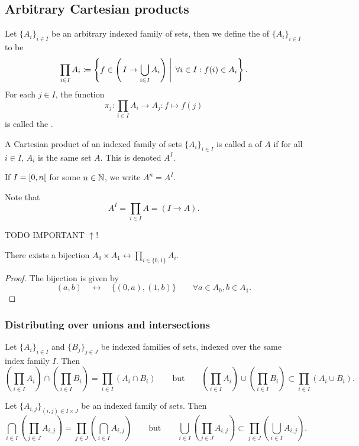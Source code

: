 \subsection{Arbitrary Cartesian products}
\begin{definition}
Let $\{A_i\}_{i\in I}$ be an arbitrary indexed family of sets, then we define the  of $\{A_i\}_{i\in I}$ to be
\[ \prod_{i\in I}A_i \coloneqq \left\{ f\in \left(\left. I \to \bigcup_{i\in I}A_i \right) \; \right| \; \forall i\in I: f(i) \in A_i \right\}. \]
For each $j\in I$, the function
\[ \pi_j : \prod_{i\in I}A_i \to A_j: f\mapsto f(j) \]
is called the .
\end{definition}

\begin{definition}
A Cartesian product of an indexed family of sets $\{A_i\}_{i\in I}$ is called a  of $A$ if for all $i\in I$, $A_i$ is the same set $A$. This is denoted $A^I$.
\end{definition}
If $I = \interval[co]{0,n}$ for some $n\in \mathbb{N}$, we write $A^n = A^I$.

Note that
\[ A^I = \prod_{i\in I} A = (I\to A).  \]

TODO IMPORTANT $\uparrow$!

\begin{lemma}
There exists a bijection $A_0\times A_1 \leftrightarrow \prod_{i\in\{0,1\}} A_i$.
\end{lemma}
\begin{proof}
The bijection is given by
\[ (a,b) \quad\leftrightarrow\quad \{(0,a),(1,b)\} \qquad \forall a\in A_0, b\in A_1. \]
\end{proof}

\subsubsection{Distributing over unions and intersections}
\begin{lemma}
Let $\{A_{i}\}_{i \in I}$ and $\{B_{j}\}_{j \in J}$ be indexed families of sets, indexed over the same index family $I$. Then
\[ \left(\prod_{i\in I}A_i\right)\cap\left(\prod_{i\in I}B_i\right) = \prod_{i\in I}(A_i\cap B_i) \qquad\text{but}\qquad \left(\prod_{i\in I}A_i\right)\cup\left(\prod_{i\in I}B_i\right) \subset \prod_{i\in I}(A_i\cup B_i). \]
\end{lemma}

\begin{lemma}
Let $\{A_{i,j}\}_{(i,j) \in I\times J}$ be an indexed family of sets. Then
\[ \bigcap_{i\in I}\left(\prod_{j\in J}A_{i,j}\right) = \prod_{j\in J}\left(\bigcap_{i\in I}A_{i,j}\right) \qquad\text{but}\qquad \bigcup_{i\in I}\left(\prod_{j\in J}A_{i,j}\right) \subset \prod_{j\in J}\left(\bigcup_{i\in I}A_{i,j}\right). \]
\end{lemma}

